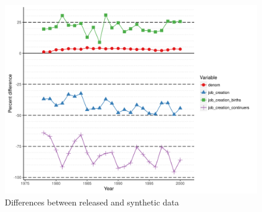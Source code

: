 \clearpage
\begin{figure}[p]
\centering
\caption{Differences between released and synthetic data\label{fig:pct_denom}\label{fig:pct_jc}}
%
\includegraphics[width=\textwidth]{results/pct_diff_8in}
\end{figure}

